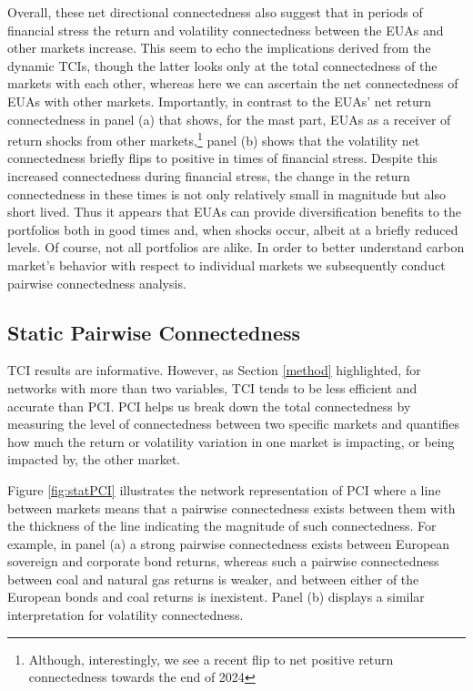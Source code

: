 \documentclass[preprint, 3p,
authoryear]{elsarticle} %
\begin{document}
Overall, these net directional connectedness also suggest that in
periods of financial stress the return and volatility connectedness
between the EUAs and other markets increase. This seem to echo the
implications derived from the dynamic TCIs, though the latter looks only
at the total connectedness of the markets with each other, whereas here
we can ascertain the net connectedness of EUAs with other markets.
Importantly, in contrast to the EUAs' net return connectedness in panel
(a) that shows, for the mast part, EUAs as a receiver of return shocks
from other
markets,\footnote{Although, interestingly, we see a recent flip to net positive return connectedness towards the end of 2024}
panel (b) shows that the volatility net connectedness briefly flips to
positive in times of financial stress. Despite this increased
connectedness during financial stress, the change in the return
connectedness in these times is not only relatively small in magnitude
but also short lived. Thus it appears that EUAs can provide
diversification benefits to the portfolios both in good times and, when
shocks occur, albeit at a briefly reduced levels. Of course, not all
portfolios are alike. In order to better understand carbon market's
behavior with respect to individual markets we subsequently conduct
pairwise connectedness analysis.

\hypertarget{static-pairwise-connectedness}{%
\subsection{Static Pairwise
Connectedness}\label{static-pairwise-connectedness}}

TCI results are informative. However, as Section \ref{method}
highlighted, for networks with more than two variables, TCI tends to be
less efficient and accurate than PCI. PCI helps us break down the total
connectedness by measuring the level of connectedness between two
specific markets and quantifies how much the return or volatility
variation in one market is impacting, or being impacted by, the other
market.

Figure \ref{fig:statPCI} illustrates the network representation of PCI
where a line between markets means that a pairwise connectedness exists
between them with the thickness of the line indicating the magnitude of
such connectedness. For example, in panel (a) a strong pairwise
connectedness exists between European sovereign and corporate bond
returns, whereas such a pairwise connectedness between coal and natural
gas returns is weaker, and between either of the European bonds and coal
returns is inexistent. Panel (b) displays a similar interpretation for
volatility connectedness.
\end{document}

